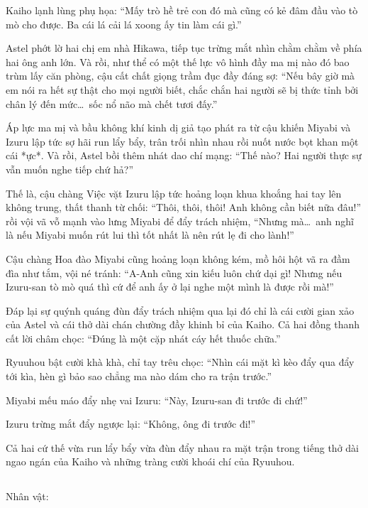 \documentclass[../main.tex]{subfiles}
\begin{document}
Kaiho lạnh lùng phụ họa: ``Mấy trò hề trẻ con đó mà cũng có kẻ đâm đầu vào tò mò cho được. Ba cái lá cải lá xoong ấy tin làm cái gì.''

Astel phớt lờ hai chị em nhà Hikawa, tiếp tục trừng mắt nhìn chằm chằm về phía hai ông anh lớn. Và rồi, như thể có một thế lực vô hình đầy ma mị nào đó bao trùm lấy căn phòng, cậu cất chất giọng trầm đục đầy đáng sợ: ``Nếu bây giờ mà em nói ra hết sự thật cho mọi người biết, chắc chắn hai người sẽ bị thức tỉnh bởi chân lý đến mức\dots\ sốc nổ não mà chết tươi đấy.''


Áp lực ma mị và bầu không khí kinh dị giả tạo phát ra từ cậu khiến Miyabi và Izuru lập tức sợ hãi run lẩy bẩy, trân trối nhìn nhau rồi nuốt nước bọt khan một cái *ực*. Và rồi, Astel bồi thêm nhát dao chí mạng: ``Thế nào? Hai người thực sự vẫn muốn nghe tiếp chứ hả?''

Thế là, cậu chàng Việc vặt Izuru lập tức hoảng loạn khua khoắng hai tay lên không trung, thất thanh từ chối: ``Thôi, thôi, thôi! Anh không cần biết nữa đâu!'' rồi vội vã vỗ mạnh vào lưng Miyabi để đẩy trách nhiệm, ``Nhưng mà\dots\ anh nghĩ là nếu Miyabi muốn rút lui thì tốt nhất là nên rút lẹ đi cho lành!''

Cậu chàng Hoa đào Miyabi cũng hoảng loạn không kém, mồ hôi hột vã ra đầm đìa như tắm, vội né tránh: ``A-Anh cũng xin kiếu luôn chứ dại gì! Nhưng nếu Izuru-san tò mò quá thì cứ để anh ấy ở lại nghe một mình là được rồi mà!''

Đáp lại sự quýnh quáng đùn đẩy trách nhiệm qua lại đó chỉ là cái cười gian xảo của Astel và cái thở dài chán chường đầy khinh bỉ của Kaiho. Cả hai đồng thanh cất lời châm chọc: ``Đúng là một cặp nhát cáy hết thuốc chữa.''

Ryuuhou bật cười khà khà, chỉ tay trêu chọc: ``Nhìn cái mặt kì kèo đẩy qua đẩy tới kìa, hèn gì bảo sao chẳng ma nào dám cho ra trận trước.''

Miyabi mếu máo đẩy nhẹ vai Izuru: ``Này, Izuru-san đi trước đi chứ!''

Izuru trừng mắt đẩy ngược lại: ``Không, ông đi trước đi!''


Cả hai cứ thế vừa run lẩy bẩy vừa đùn đẩy nhau ra mặt trận trong tiếng thở dài ngao ngán của Kaiho và những tràng cười khoái chí của Ryuuhou.

\newpage

\subsection*{\label{ep-M34.IV}}
\vspace{-4pt}
\begin{center}
    {\caviar\fontsize{12pt}{12pt}\selectfont Nhân vật:      }
\end{center}
\end{document}
